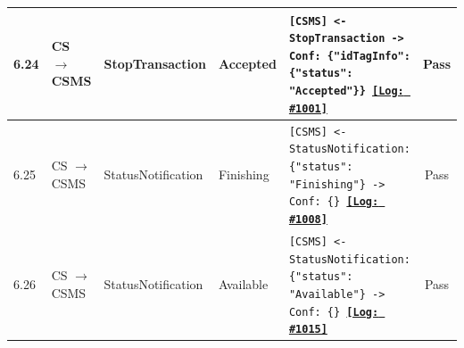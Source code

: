 \documentclass[10pt, a4paper, landscape]{article}
\begin{document}
\begin{longtable}{|p{1.0cm}|p{2.5cm}|p{4.0cm}|p{5.0cm}|p{10.0cm}|c|}
\hline
6.24 & CS $\to$ CSMS & StopTransaction & Accepted & \footnotesize\texttt{[CSMS] <- StopTransaction \newline [CSMS] -> Conf: \{"idTagInfo": \{"status": "Accepted"\}\} \newline \hyperref[log:6.24]{\textbf{[Log: \#1001]}}} & Pass \\
\hline
6.25 & CS $\to$ CSMS & StatusNotification & Finishing & \footnotesize\texttt{[CSMS] <- StatusNotification: \{"status": "Finishing"\} \newline [CSMS] -> Conf: \{\} \newline \hyperref[log:6.25]{\textbf{[Log: \#1008]}}} & Pass \\
\hline
6.26 & CS $\to$ CSMS & StatusNotification & Available & \footnotesize\texttt{[CSMS] <- StatusNotification: \{"status": "Available"\} \newline [CSMS] -> Conf: \{\} \newline \hyperref[log:6.26]{\textbf{[Log: \#1015]}}} & Pass \\
\hline


\end{longtable}
\end{document}
